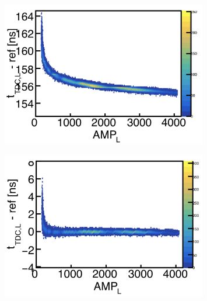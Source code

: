 \documentclass[review]{elsarticle}
\begin{document}
\begin{figure}[h!]
\centering
\includegraphics[width=0.8\textwidth]{tw_before.png}
\caption{}
\end{figure}
\begin{figure}[h!]
\centering
\includegraphics[width=0.8\textwidth]{tw_after.png}
\caption{}
\end{figure}
\end{document}
